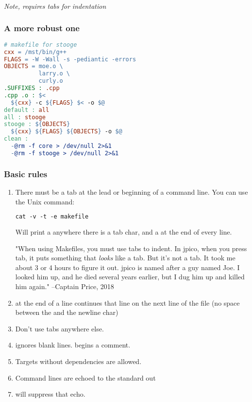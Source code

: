 \textit{Note, requires tabs for indentation}

\subsubsection{A more robust one}

\begin{lstlisting}[language=make]
# makefile for stooge
cxx = /mst/bin/g++
FLAGS = -W -Wall -s -pediantic -errors
OBJECTS = moe.o \
          larry.o \
          curly.o
.SUFFIXES : .cpp
.cpp .o : $<
  ${cxx} -c ${FLAGS} $< -o $@
default : all
all : stooge
stooge : ${OBJECTS}
  ${cxx} ${FLAGS} ${OBJECTS} -o $@
clean : 
  -@rm -f core > /dev/null 2>&1
  -@rm -f stooge > /dev/null 2>&1
\end{lstlisting}

\subsubsection{Basic rules}

\begin{enumerate}
  \item There must be a tab at the lead or beginning of a command line. You can use the Unix command:

  \begin{lstlisting}[language=make]
  cat -v -t -e makefile
  \end{lstlisting}

  Will print a  anywhere there is a tab char, and a \shellcmd{\$} at the end of every line.

  "When using Makefiles, you must use tabs to indent. In jpico, when you press tab, it puts something that \textit{looks} like a tab. But it's not a tab. It took me about 3 or 4 hours to figure it out. jpico is named after a guy named Joe. I looked him up, and he died several years earlier, but I dug him up and killed him again." --Captain Price, 2018

  \item \shellcmd{\textbackslash} at the end of a line continues that line on the next line of the file (no space between the \shellcmd{\textbackslash} and the newline char)
  \item Don't use tabs anywhere else.
  \item \shellcmd{make} ignores blank lines. \shellcmd{\#} begins a comment. 
  \item Targets without dependencies are allowed.
  \item Command lines are echoed to the standard out
  \item \shellcmd{-@} will suppress that echo.
\end{enumerate}
